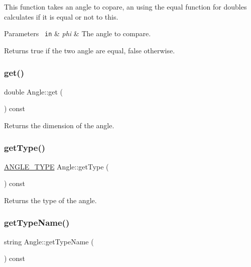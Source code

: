 This function takes an angle to copare, an using the {\ttfamily equal} function for {\ttfamily double}s calculates if it is equal or not to {\ttfamily this}. 
\begin{DoxyParams}[1]{Parameters}
\mbox{\texttt{ in}}  & {\em phi} & The angle to compare. \\
\hline
\end{DoxyParams}
\begin{DoxyReturn}{Returns}
{\ttfamily true} if the two angle are equal, {\ttfamily false} otherwise. 
\end{DoxyReturn}
\mbox{\label{class_angle_a8ec5cc925d4ab3a3232746f254bd33a4}} 
\subsubsection{\texorpdfstring{get()}{get()}}
{\footnotesize\ttfamily double Angle\+::get (\begin{DoxyParamCaption}{ }\end{DoxyParamCaption}) const\hspace{0.3cm}{\ttfamily [inline]}}



Returns the dimension of the angle. 

\mbox{\label{class_angle_a827079369e1344c8761723be0665bb2e}} 
\subsubsection{\texorpdfstring{getType()}{getType()}}
{\footnotesize\ttfamily \mbox{\hyperlink{class_angle_a4f7b9849ce8780bcba95ca3ee45cff77}{A\+N\+G\+L\+E\+\_\+\+T\+Y\+PE}} Angle\+::get\+Type (\begin{DoxyParamCaption}{ }\end{DoxyParamCaption}) const\hspace{0.3cm}{\ttfamily [inline]}}



Returns the type of the angle. 

\mbox{\label{class_angle_a3253eb4e061fa49be862120370fb836b}} 
\subsubsection{\texorpdfstring{getTypeName()}{getTypeName()}}
{\footnotesize\ttfamily string Angle\+::get\+Type\+Name (\begin{DoxyParamCaption}{ }\end{DoxyParamCaption}) const\hspace{0.3cm}{\ttfamily [inline]}}

